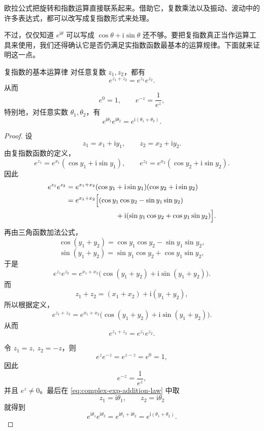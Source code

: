 \begin{tishi}[欧拉公式的意义]
	欧拉公式把旋转和指数运算直接联系起来。借助它，复数乘法以及振动、波动中的许多表达式，都可以改写成复指数形式来处理。
\end{tishi}

不过，仅仅知道 $e^{\mathrm{i}\theta}$ 可以写成 $\cos\theta+\mathrm{i}\sin\theta$ 还不够。要把复指数真正当作运算工具来使用，我们还得确认它是否仍满足实指数函数最基本的运算规律。下面就来证明这一点。

\begin{dingli}{复指数的基本运算律}{}
对任意复数 $z_1,z_2$，都有
\begin{equation}\label{eq:complex-exp-addition-law}
    e^{z_1+z_2}=e^{z_1}e^{z_2}.
\end{equation}
从而
\begin{equation}
    e^0=1,\qquad e^{-z}=\frac{1}{e^z},
\end{equation}
特别地，对任意实数 $\theta_1,\theta_2$，有
\begin{equation}
    e^{\mathrm{i}\theta_1}e^{\mathrm{i}\theta_2}=e^{\mathrm{i}(\theta_1+\theta_2)}.
\end{equation}
\end{dingli}

\begin{proof}
设
\[
z_1=x_1+\mathrm{i}y_1,\qquad z_2=x_2+\mathrm{i}y_2.
\]
由复指数函数的定义，
\[
e^{z_1}=e^{x_1}(\cos y_1+\mathrm{i}\sin y_1),\qquad
e^{z_2}=e^{x_2}(\cos y_2+\mathrm{i}\sin y_2).
\]
因此
\begin{align*}
e^{z_1}e^{z_2}
&=e^{x_1+x_2}(\cos y_1+\mathrm{i}\sin y_1)(\cos y_2+\mathrm{i}\sin y_2)\\
&=e^{x_1+x_2}\Bigl[(\cos y_1\cos y_2-\sin y_1\sin y_2) \\
&\qquad\qquad\qquad\quad +\mathrm{i}(\sin y_1\cos y_2+\cos y_1\sin y_2)\Bigr].
\end{align*}
再由三角函数加法公式，
\[
\cos(y_1+y_2)=\cos y_1\cos y_2-\sin y_1\sin y_2,
\]
\[
\sin(y_1+y_2)=\sin y_1\cos y_2+\cos y_1\sin y_2,
\]
于是
\[
e^{z_1}e^{z_2}=e^{x_1+x_2}\bigl(\cos(y_1+y_2)+\mathrm{i}\sin(y_1+y_2)\bigr).
\]
而
\[
z_1+z_2=(x_1+x_2)+\mathrm{i}(y_1+y_2),
\]
所以根据定义，
\[
e^{z_1+z_2}=e^{x_1+x_2}\bigl(\cos(y_1+y_2)+\mathrm{i}\sin(y_1+y_2)\bigr).
\]
从而
\[
e^{z_1+z_2}=e^{z_1}e^{z_2}.
\]

令 $z_1=z,\ z_2=-z$，则
\[
e^z e^{-z}=e^{z-z} =e^0=1,
\]
因此
\[
e^{-z}=\frac{1}{e^z},
\]
并且 $e^z\neq 0$。最后在 \eqref{eq:complex-exp-addition-law} 中取
\[
z_1=\mathrm{i}\theta_1,\qquad z_2=\mathrm{i}\theta_2
\]
就得到
\[
e^{\mathrm{i}\theta_1}e^{\mathrm{i}\theta_2}=e^{\mathrm{i}\theta_1+\mathrm{i}\theta_2}=e^{\mathrm{i}(\theta_1+\theta_2)}.
\]
\end{proof}

